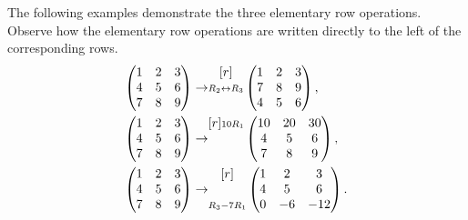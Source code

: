 \begin{example}
    The following examples demonstrate the three elementary row operations. Observe how the elementary row operations are written directly to the left of the corresponding rows.
    \begin{align*}
        \begin{pmatrix}1 & 2 & 3 \\ 4 & 5 & 6 \\ 7 & 8 & 9\end{pmatrix} \rightarrow& \begin{matrix}[r] \scriptstyle \\ \scriptstyle R_2 \leftrightarrow R_3 \\ \scriptstyle \end{matrix} \begin{pmatrix}1 & 2 & 3 \\ 7 & 8 & 9 \\ 4 & 5 & 6\end{pmatrix},\\
        \begin{pmatrix}1 & 2 & 3 \\ 4 & 5 & 6 \\ 7 & 8 & 9\end{pmatrix} \rightarrow& \begin{matrix}[r] \scriptstyle 10R_1\\ \scriptstyle \\ \scriptstyle \end{matrix} \begin{pmatrix}10 & 20 & 30 \\ 4 & 5 & 6 \\ 7 & 8 & 9\end{pmatrix},\\
        \begin{pmatrix}1 & 2 & 3 \\ 4 & 5 & 6 \\ 7 & 8 & 9\end{pmatrix} \rightarrow& \begin{matrix}[r] \scriptstyle \\ \scriptstyle \\ \scriptstyle R_3 - 7R_1\end{matrix}\begin{pmatrix}1 & 2 & 3 \\ 4 & 5 & 6 \\ 0 & -6 & -12\end{pmatrix}.
    \end{align*}

\end{example}
